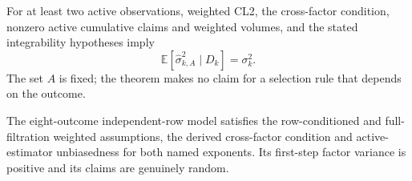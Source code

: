 \begin{theorem}
\label{thm:sigma2w-active-unbiased}
\leanok
{}
For at least two active observations, weighted CL2, the cross-factor condition,
nonzero active cumulative claims and weighted volumes, and the stated
integrability hypotheses imply
\[
 \mathbb E[\widehat\sigma_{k,A}^2\mid D_k]=\sigma_k^2.
\]
The set $A$ is fixed; the theorem makes no claim for a selection rule that
depends on the outcome.
\end{theorem}

\begin{theorem}[Finite witnesses for $\alpha=0$ and $\alpha=2$]
\label{thm:mack1999-weighted-witnesses}
\leanok
The eight-outcome independent-row model satisfies the row-conditioned and
full-filtration weighted assumptions, the derived cross-factor condition and
active-estimator unbiasedness for both named exponents.  Its first-step
factor variance is positive and its claims are genuinely random.
\end{theorem}
